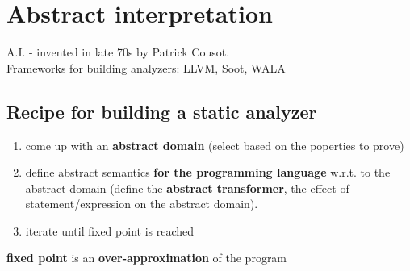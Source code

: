 \chapter{Abstract interpretation}
A.I. - invented in late 70s by Patrick Cousot. \\
Frameworks for building analyzers: LLVM, Soot, WALA

\section{Recipe for building a static analyzer}
\begin{enumerate}
 \item come up with an \textbf{abstract domain} (select based on the poperties to prove)
 \item define abstract semantics \textbf{for the programming language} w.r.t. to the abstract domain (define the \textbf{abstract transformer}, the effect of statement/expression on the abstract domain).
 \item iterate until fixed point is reached
\end{enumerate}

\textbf{fixed point} is an \textbf{over-approximation} of the program

